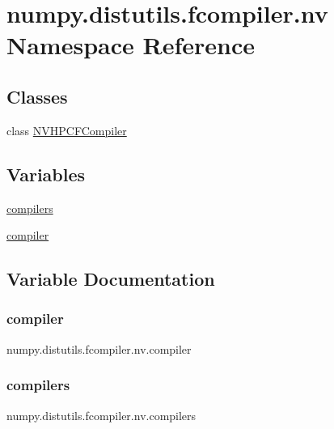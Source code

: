 \hypertarget{namespacenumpy_1_1distutils_1_1fcompiler_1_1nv}{}\section{numpy.\+distutils.\+fcompiler.\+nv Namespace Reference}
\label{namespacenumpy_1_1distutils_1_1fcompiler_1_1nv}
\subsection*{Classes}
\begin{DoxyCompactItemize}
\item 
class \hyperlink{classnumpy_1_1distutils_1_1fcompiler_1_1nv_1_1NVHPCFCompiler}{N\+V\+H\+P\+C\+F\+Compiler}
\end{DoxyCompactItemize}
\subsection*{Variables}
\begin{DoxyCompactItemize}
\item 
\hyperlink{namespacenumpy_1_1distutils_1_1fcompiler_1_1nv_a40d53dfdec07c6b794b3a11178554ca1}{compilers}
\item 
\hyperlink{namespacenumpy_1_1distutils_1_1fcompiler_1_1nv_ab769a805262d0e2da904d2a3756a319e}{compiler}
\end{DoxyCompactItemize}


\subsection{Variable Documentation}
\mbox{\label{namespacenumpy_1_1distutils_1_1fcompiler_1_1nv_ab769a805262d0e2da904d2a3756a319e}} 
\subsubsection{\texorpdfstring{compiler}{compiler}}
{\footnotesize\ttfamily numpy.\+distutils.\+fcompiler.\+nv.\+compiler}

\mbox{\label{namespacenumpy_1_1distutils_1_1fcompiler_1_1nv_a40d53dfdec07c6b794b3a11178554ca1}} 
\subsubsection{\texorpdfstring{compilers}{compilers}}
{\footnotesize\ttfamily numpy.\+distutils.\+fcompiler.\+nv.\+compilers}

